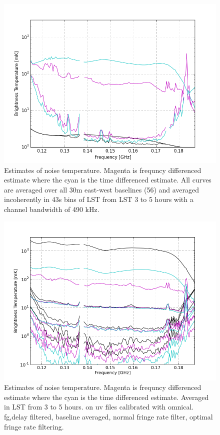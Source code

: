 \documentclass[twocolumn,numberedappendix]{emulateapj}
\begin{document}
{\begin{figure}[h!]\centering
\includegraphics[width=\columnwidth, height=.8\columnwidth]{plots/noise_t_35.png}
\caption{Estimates of noise temperature. Magenta is frequncy differenced
estimate where the cyan is the time differenced estimate. All curves are
averaged over all 30m east-west baselines (56) and averaged incoherently in 43s
bins of LST from LST 3 to 5 hours with a channel bandwidth of 490 kHz.}
\label{fig:noise_t}
\end{figure}


\begin{figure}[h!]\centering
\includegraphics[width=\columnwidth, height=.8\columnwidth]{plots/noise_vs_fq_plot.png}
\caption{Estimates of noise temperature. Magenta is frequncy differenced
estimate where the cyan is the time differenced estimate. Averaged in LST from 3
to 5 hours. on uv files calibrated with omnical. fg,delay filtered, baseline
averaged, normal fringe rate filter, optimal fringe rate filtering.}
\label{fig:noise_omni_uv}
\end{figure}


}
\end{document}
